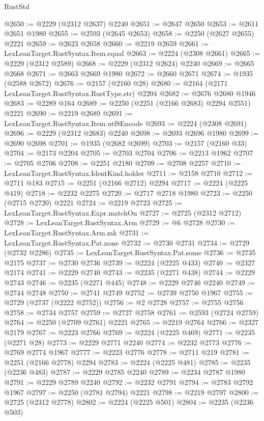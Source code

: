 \begin{lexlean}{RustStd}
\begin{coremodule}
@2650 := @2229 (@2312 @2637) @2240
@2651 := @2647 @2650
@2653 := @2611 @2651 @1980
@2655 := @2593 (@2645 @2653)
@2658 := @2250 (@2627 @2655) @2221
@2659 := @2623 @2658
@2660 := @2219 @2659
@2661 := LexLeanTarget.RustSyntax.Item.equal
@2663 := @2224 (@2308 @2661)
@2665 := @2229 (@2312 @2589)
@2668 := @2229 (@2312 @2624) @2240
@2669 := @2665 @2668
@2671 := @2663 @2669 @1980
@2672 := @2660 @2671
@2674 := @1935 (@2588 @2672)
@2676 := @2157 (@2160 @28)
@2680 := @2164 (@2171 LexLeanTarget.RustSyntax.RustType.str) @2204
@2682 := @2676 @2680 @1946
@2683 := @2289 @164
@2689 := @2250 (@2251 (@2166 @2683) @2294 @2551) @2221
@2690 := @2219 @2689
@2691 := LexLeanTarget.RustSyntax.Item.utf8Encode
@2693 := @2224 (@2308 @2691)
@2696 := @2229 (@2312 @2683) @2240
@2698 := @2693 @2696 @1980
@2699 := @2690 @2698
@2701 := @1935 (@2682 @2699)
@2703 := @2157 (@2160 @33)
@2704 := @2173 @2204
@2705 := @2703 @2704
@2706 := @2213 @1962
@2707 := @2705 @2706
@2708 := @2251 @2180
@2709 := @2708 @2257
@2710 := LexLeanTarget.RustSyntax.IdentKind.holder
@2711 := @2158 @2710
@2712 := @2711 @183
@2715 := @2251 (@2166 @2712) @2294
@2717 := @2224 (@2225 @419)
@2718 := @2232 @2275
@2720 := @2717 @2718 @1980
@2723 := @2250 (@2715 @2720) @2221
@2724 := @2219 @2723
@2725 := LexLeanTarget.RustSyntax.Expr.matchOn
@2727 := @2725 (@2312 @2712)
@2728 := LexLeanTarget.RustSyntax.Arm
@2729 := @6 @2728
@2730 := LexLeanTarget.RustSyntax.Arm.mk
@2731 := LexLeanTarget.RustSyntax.Pat.none
@2732 := @2730 @2731
@2734 := @2729 (@2732 @2286)
@2735 := LexLeanTarget.RustSyntax.Pat.some
@2736 := @2735 @2175
@2737 := @2730 @2736
@2739 := @2224 (@2225 @433)
@2740 := @2327 @2174
@2741 := @2229 @2740
@2743 := @2235 (@2271 @438)
@2744 := @2229 @2743
@2746 := @2235 (@2271 @445)
@2748 := @2229 @2746 @2240
@2749 := @2744 @2748
@2750 := @2741 @2749
@2752 := @2739 @2750 @1967
@2755 := @2729 (@2737 (@2222 @2752))
@2756 := @2 @2728
@2757 := @2755 @2756
@2758 := @2734 @2757
@2759 := @2727 @2758
@2761 := @2593 (@2724 @2759)
@2764 := @2250 (@2709 @2761) @2221
@2765 := @2219 @2764
@2766 := @2327 @2179
@2767 := @2223 @2766
@2769 := @2224 (@2225 @469)
@2771 := @2235 (@2271 @28)
@2773 := @2229 @2771 @2240
@2774 := @2232 @2773
@2776 := @2769 @2774 @1967
@2777 := @2223 @2776
@2778 := @2711 @219
@2781 := @2251 (@2166 @2778) @2294
@2783 := @2224 (@2225 @481)
@2785 := @2235 (@2236 @483)
@2787 := @2229 @2785 @2240
@2789 := @2234 @2787 @1980
@2791 := @2229 @2789 @2240
@2792 := @2232 @2791
@2794 := @2783 @2792 @1967
@2797 := @2250 (@2781 @2794) @2221
@2798 := @2219 @2797
@2800 := @2725 (@2312 @2778)
@2802 := @2224 (@2225 @501)
@2804 := @2235 (@2236 @503)

\end{coremodule}
\end{lexlean}
